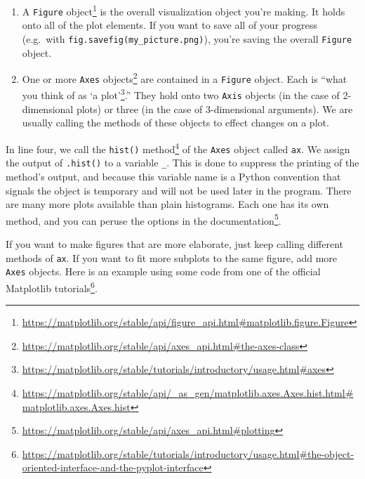 \documentclass[12pt,krantz2]{krantz}
\renewcommand{\href}[2]{#2\footnote{\url{#1}}}
\begin{document}
\begin{enumerate}
\def\labelenumi{\arabic{enumi}.}
\item
  A \href{https://matplotlib.org/stable/api/figure_api.html\#matplotlib.figure.Figure}{\texttt{Figure} object} is the overall visualization object you're making. It holds onto all of the plot elements. If you want to save all of your progress (e.g.~with \texttt{fig.savefig(\textquotesingle{}my\_picture.png\textquotesingle{})}), you're saving the overall \texttt{Figure} object.
\item
  One or more \href{https://matplotlib.org/stable/api/axes_api.html\#the-axes-class}{\texttt{Axes} objects} are contained in a \texttt{Figure} object. Each is ``\href{https://matplotlib.org/stable/tutorials/introductory/usage.html\#axes}{what you think of as `a plot'}.'' They hold onto two \texttt{Axis} objects (in the case of 2-dimensional plots) or three (in the case of 3-dimensional arguments). We are usually calling the methods of these objects to effect changes on a plot.
\end{enumerate}

In line four, we call the \href{https://matplotlib.org/stable/api/_as_gen/matplotlib.axes.Axes.hist.html\#matplotlib.axes.Axes.hist}{\texttt{hist()} method} of the \texttt{Axes} object called \texttt{ax}. We assign the output of \texttt{.hist()} to a variable \texttt{\_}. This is done to suppress the printing of the method's output, and because this variable name is a Python convention that signals the object is temporary and will not be used later in the program. There are many more plots available than plain histograms. Each one has its own method, and you can peruse the options in \href{https://matplotlib.org/stable/api/axes_api.html\#plotting}{the documentation}.

If you want to make figures that are more elaborate, just keep calling different methods of \texttt{ax}. If you want to fit more subplots to the same figure, add more \texttt{Axes} objects. Here is an example using some code from \href{https://matplotlib.org/stable/tutorials/introductory/usage.html\#the-object-oriented-interface-and-the-pyplot-interface}{one of the official Matplotlib tutorials}.
\end{document}
